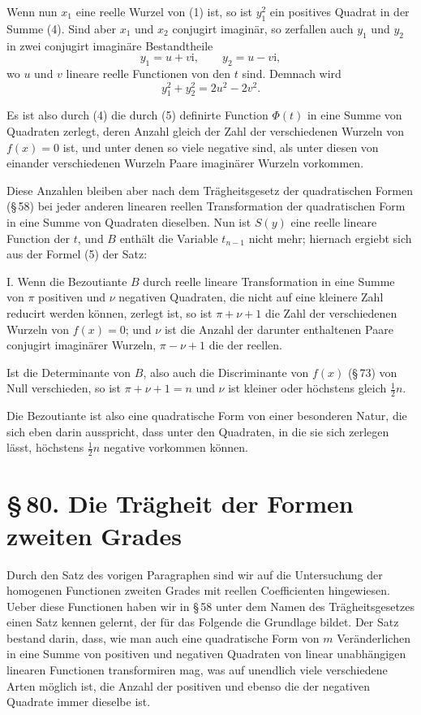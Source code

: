 \documentclass[11pt]{article}
\providecommand{\sect}[2]{\section*{\S\,#1. #2}}
\providecommand{\ii}{\mathrm{i}}
\begin{document}
Wenn nun $x_1$ eine reelle Wurzel von (1) ist, so ist $y_1^2$ ein positives Quadrat in der Summe (4). Sind aber $x_1$ und $x_2$ conjugirt imagin\"ar, so zerfallen auch $y_1$ und $y_2$ in zwei conjugirt imagin\"are Bestandtheile
\[
        y_1=u+v\ii,
        \qquad
        y_2=u-v\ii,
\]
wo $u$ und $v$ lineare reelle Functionen von den $t$ sind. Demnach wird
\[
        y_1^2+y_2^2=2u^2-2v^2.
\]

Es ist also durch (4) die durch (5) definirte Function $\Phi(t)$ in eine Summe von Quadraten zerlegt, deren Anzahl gleich der Zahl der verschiedenen Wurzeln von $f(x)=0$ ist, und unter denen so viele negative sind, als unter diesen von einander verschiedenen Wurzeln Paare imagin\"arer Wurzeln vorkommen.

Diese Anzahlen bleiben aber nach dem Tr\"agheitsgesetz der quadratischen Formen (\S\,58) bei jeder anderen linearen reellen Transformation der quadratischen Form in eine Summe von Quadraten dieselben. Nun ist $S(y)$ eine reelle lineare Function der $t$, und $B$ enth\"alt die Variable $t_{n-1}$ nicht mehr; hiernach ergiebt sich aus der Formel (5) der Satz:

I. Wenn die Bezoutiante $B$ durch reelle lineare Transformation in eine Summe von $\pi$ positiven und $\nu$ negativen Quadraten, die nicht auf eine kleinere Zahl reducirt werden k\"onnen, zerlegt ist, so ist $\pi+\nu+1$ die Zahl der verschiedenen Wurzeln von $f(x)=0$; und $\nu$ ist die Anzahl der darunter enthaltenen Paare conjugirt imagin\"arer Wurzeln, $\pi-\nu+1$ die der reellen.

Ist die Determinante von $B$, also auch die Discriminante von $f(x)$ (\S\,73) von Null verschieden, so ist $\pi+\nu+1=n$ und $\nu$ ist kleiner oder h\"ochstens gleich $\frac12n$.

Die Bezoutiante ist also eine quadratische Form von einer besonderen Natur, die sich eben darin ausspricht, dass unter den Quadraten, in die sie sich zerlegen l\"asst, h\"ochstens $\frac12n$ negative vorkommen k\"onnen.

\sect{80}{Die Tr\"agheit der Formen zweiten Grades}

Durch den Satz des vorigen Paragraphen sind wir auf die Untersuchung der homogenen Functionen zweiten Grades mit reellen Coefficienten hingewiesen. Ueber diese Functionen haben wir in \S\,58 unter dem Namen des Tr\"agheitsgesetzes einen Satz kennen gelernt, der f\"ur das Folgende die Grundlage bildet. Der Satz bestand darin, dass, wie man auch eine quadratische Form von $m$ Ver\"anderlichen in eine Summe von positiven und negativen Quadraten von linear unabh\"angigen linearen Functionen transformiren mag, was auf unendlich viele verschiedene Arten m\"oglich ist, die Anzahl der positiven und ebenso die der negativen Quadrate immer dieselbe ist.
\end{document}
